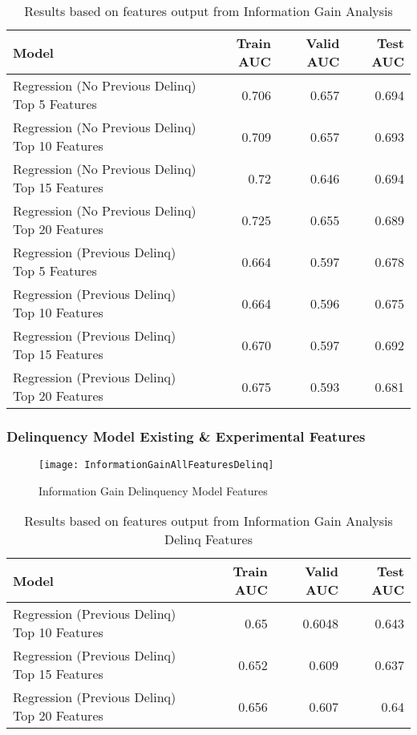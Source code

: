 \begin{table}[H]
	\centering
	\resizebox{\textwidth}{!}
	{
		\begin{tabular}{l | r | r| r}
			\hline
			\textbf{Model} & \textbf{Train AUC} & \textbf{Valid AUC} &  \textbf{Test AUC} \\
			\hline
			Regression (No Previous Delinq) Top 5 Features & 0.706 & 0.657 & 0.694  \\
			Regression (No Previous Delinq) Top 10 Features & 0.709 & 0.657 & 0.693  \\
			Regression (No Previous Delinq) Top 15 Features & 0.72 & 0.646 & 0.694  \\
			Regression (No Previous Delinq) Top 20 Features & 0.725 & 0.655 & 0.689  \\
			\hline
			
			Regression (Previous Delinq) Top 5 Features &  0.664 &  0.597 &  0.678  \\
			Regression (Previous Delinq) Top 10 Features &  0.664 &  0.596 &  0.675  \\
			Regression (Previous Delinq) Top 15 Features &  0.670 &  0.597 &  0.692  \\
			Regression (Previous Delinq) Top 20 Features &  0.675 &  0.593 &  0.681  \\		
			\hline
		\end{tabular}
	}
	\caption{Results based on features output from Information Gain Analysis}
	\label{table:featureselection_base_model}
\end{table}

\subsubsection{Delinquency Model Existing \& Experimental Features}

\begin{figure}[H]
	\texttt{[image: InformationGainAllFeaturesDelinq]}
	\caption{Information Gain Delinquency Model Features}
	\label{fig:Information Gain Delinquency Model Features}
\end{figure}

\begin{table}[H]
	\centering
	\resizebox{\textwidth}{!}
	{
		\begin{tabular}{l | r | r| r}
			\hline
			\textbf{Model} & \textbf{Train AUC} & \textbf{Valid AUC} &  \textbf{Test AUC} \\
			\hline
			Regression (Previous Delinq) Top 10 Features &  0.65 &  0.6048 &  0.643  \\
			Regression (Previous Delinq) Top 15 Features &  0.652 &  0.609 &  0.637  \\
			Regression (Previous Delinq) Top 20 Features &  0.656 &  0.607 &  0.64  \\			
			\hline
		\end{tabular}
	}
	\caption{Results based on features output from Information Gain Analysis Delinq Features }
	\label{table:featureselection_base_model}
\end{table}

